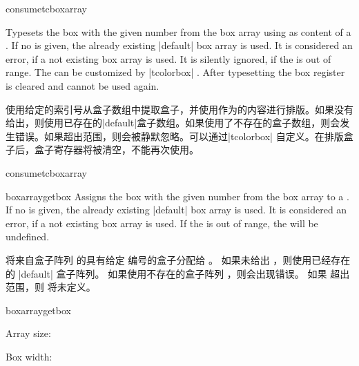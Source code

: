 \begin{docCommand}[doc new=2015-07-13]{consumetcboxarray}{}
\begin{articleside}[before skip=5pt]
Typesets the box with the given  number from the box array 
using  as content of a .
If no  is given, the already existing |default| box array is used.
It is considered an error, if a not existing box array  is used.
It is silently ignored, if the  is out of range.
The  can be customized by |tcolorbox| .
After typesetting the box register is cleared and cannot be used again.

使用给定的索引号从盒子数组中提取盒子，并使用作为的内容进行排版。如果没有给出，则使用已存在的|default|盒子数组。如果使用了不存在的盒子数组，则会发生错误。如果超出范围，则会被静默忽略。可以通过|tcolorbox| 自定义。在排版盒子后，盒子寄存器将被清空，不能再次使用。
\tcblower{}
\end{articleside}
\begin{exdispExample}{consumetcboxarray}
\begin{tcolorbox}[enhanced jigsaw,size=fbox,width=6cm,
colback=yellow!10,colframe=yellow!10!black,
enforce breakable,%
break at=5cm,
watermark text=\arabic{tcbbreakpart},
reset and store to box array
]
\lipsum[1]
\end{tcolorbox}

 \hfill {} \hfill {}
\end{exdispExample}
\end{docCommand}


\begin{docCommand}[doc new=2015-07-13]{boxarraygetbox}{}
Assigns the box with the given  number from the box array 
to a .
If no  is given, the already existing |default| box array is used.
It is considered an error, if a not existing box array  is used.
If the  is out of range, the  will be undefined.

将来自盒子阵列  的具有给定  编号的盒子分配给 。
如果未给出 ，则使用已经存在的 |default| 盒子阵列。
如果使用不存在的盒子阵列 ，则会出现错误。
如果  超出范围，则  将未定义。
\begin{exdispExample}{boxarraygetbox}

\boxarraygetsize{\mysize} Array size: \mysize

Box width: \the\wd\mybox
\quad\usebox{\mybox}
\end{exdispExample}
\end{docCommand}


